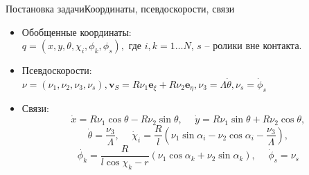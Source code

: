 \documentclass{beamer}
\renewcommand{\vec}[1]{\boldsymbol{\mathbf{#1}}}
\begin{document}
\begin{frame}{Постановка задачи}{Координаты, псевдоскорости, связи}
  \begin{itemize}
  \item {
    Обобщенные координаты: \\
    $q = (x, y, \theta, \chi_i, \phi_k, \phi_s),$ где $i,k = 1\dots N$, $s$ -- ролики вне контакта.
  }
  \item{
    Псевдоскорости:\\
    $\nu = (\nu_1, \nu_2, \nu_3, \nu_s), \vec{v}_S = R\nu_1\vec{e}_\xi + R\nu_2\vec{e}_\eta, \nu_3 = \Lambda\dot{\theta}, \nu_s = \dot{\phi}_s$
  }
  \item {
    Связи:
	$$ \dot{x} = R \nu_1\cos\theta-R\nu_2\sin\theta, \hspace{15pt} \dot{y} = R\nu_1\sin\theta+R\nu_2\cos\theta,$$
	$$\dot{\theta} = \frac{\nu_3}{\Lambda}, \hspace{15pt} \dot{\chi}_i = \frac{R}{l}(\nu_1\sin\alpha_i - \nu_2\cos\alpha_i - \frac{\nu_3}{\Lambda}), $$
	$$ \dot{\phi_k} = \frac{R}{l\cos\chi_k-r}(\nu_1\cos\alpha_k + \nu_2\sin\alpha_k), \hspace{15pt} \dot{\phi}_s = \nu_s $$
  }

  \end{itemize}
\end{frame}
\end{document}
